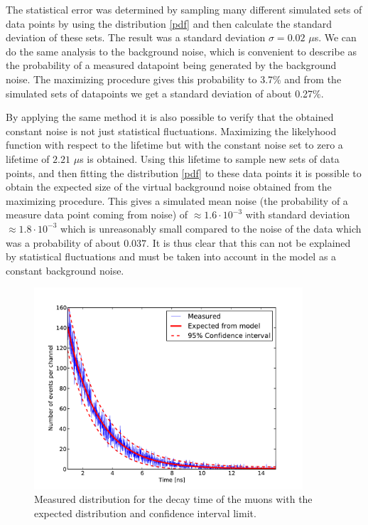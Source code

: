 \documentclass[10pt,twocolumn]{article}
\begin{document}
The statistical error was determined by sampling many different simulated sets of data points by using the distribution \eqref{pdf} and then calculate the standard deviation of these sets. The result was a standard deviation $\sigma=0.02$ $\mu$s. We can do the same analysis to the background noise, which is convenient to describe as the probability of a measured datapoint being generated by the background noise. The maximizing procedure gives this probability to 3.7\% and from the simulated sets of datapoints we get a standard deviation of about 0.27\%. %
\newline

By applying the same method it is also possible to verify that the obtained constant noise is not just statistical fluctuations. Maximizing the likelyhood function with respect to the lifetime but with the constant noise set to zero a lifetime of $2.21$ $\mu$s is obtained. Using this lifetime to sample new sets of data points, and then fitting the distribution \eqref{pdf} to these data points it is possible to obtain the expected size of the virtual background noise obtained from the maximizing procedure. This gives a simulated mean noise (the probability of a measure data point coming from noise) of $\approx1.6\cdot 10^{-3}$ with standard deviation $\approx1.8\cdot 10^{-3}$ which is unreasonably small compared to the noise of the data which was a probability of about $0.037$. It is thus clear that this can not be explained by statistical fluctuations and must be taken into account in the model as a constant background noise. 


\begin{figure}
\centering
\includegraphics[width=10cm]{lifetimeSpectrum.pdf}
\caption{Measured distribution for the decay time of the muons with the expected distribution and confidence interval limit.}
\label{lifetime}
\end{figure}
\end{document}
